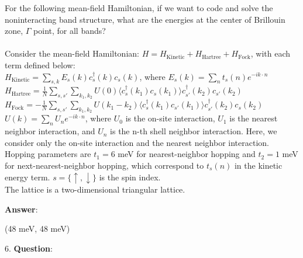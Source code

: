 \documentclass{article}
\begin{document}
   For the following mean-field Hamiltonian, if we want to code and solve the noninteracting band structure, what are the energies at the center of Brillouin zone, $\Gamma$ point, for all bands? \\ \\Consider the mean-field Hamiltonian: $H = H_{\text{Kinetic}} + H_{\text{Hartree}} +H_{\text{Fock}}$, with each term defined below: \\$H_{\text{Kinetic}} = \sum_{s, k} E_s(k) c^\dagger_s(k) c_s(k)$, where $E_s(k)=\sum_{n} t_s(n) e^{-i k \cdot n}$  \\$H_{\text{Hartree}} = \frac{1}{N} \sum_{s, s'} \sum_{k_1, k_2} U(0) \langle c_s^\dagger(k_1) c_s(k_1) \rangle c_{s'}^\dagger(k_2) c_{s'}(k_2)$ \\$H_{\text{Fock}} = -\frac{1}{N} \sum_{s, s'} \sum_{k_1, k_2} U(k_1 - k_2) \langle c_s^\dagger(k_1) c_{s'}(k_1) \rangle c_{s'}^\dagger(k_2) c_s(k_2)$ \\$U(k) = \sum_{n} U_n e^{-i k \cdot n}$, where $U_0$ is the on-site interaction, $U_1$ is the nearest neighbor interaction, and $U_n$ is the n-th shell neighbor interaction. Here, we consider only the on-site interaction and the nearest neighbor interaction. \\Hopping parameters are $t_1 = 6$ meV for nearest-neighbor hopping and $t_2 = 1$ meV for next-nearest-neighbor hopping, which correspond to $t_s(n)$ in the kinetic energy term. $s = \{\uparrow, \downarrow\}$ is the spin index. \\The lattice is a two-dimensional triangular lattice.

   \textbf{Answer}:

   (48 meV, 48 meV) \\


\clearpage

6. \textbf{Question}:
\end{document}
